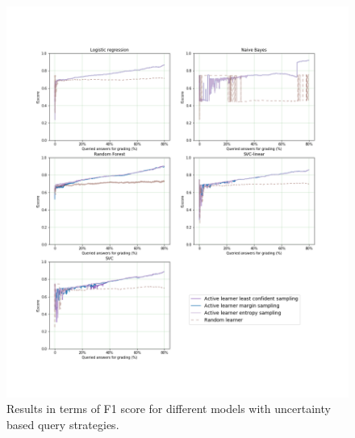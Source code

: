 \begin{figure}[!htb]
	\centering
	\includegraphics[scale=0.46]{images/binary/task7_f1score_uncertainty}
	\caption{Results in terms of F1 score for different models with uncertainty based query strategies.}
	\label{t7_b_uncertainty_f1}
\end{figure}


